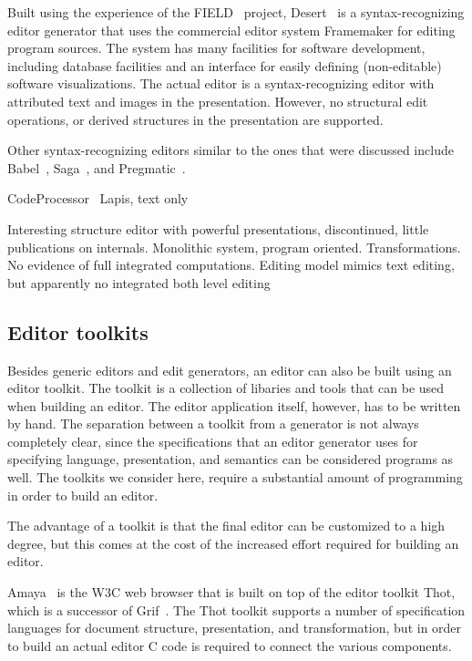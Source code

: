Built using the experience of the FIELD~\cite{reiss94field} project, Desert~\cite{reiss99desert} is a syntax-recognizing editor generator that uses the commercial editor system Framemaker for editing program sources. The system has many facilities for software development, including database facilities and an interface for easily defining (non-editable) software visualizations. The actual editor is a syntax-recognizing editor with attributed text and images in the presentation. However, no structural edit operations, or derived structures in the presentation are supported.


Other syntax-recognizing editors similar to the ones that were discussed include  Babel~\cite{horton81babel}, Saga~\cite{campbell84saga}, and Pregmatic~\cite{brand92pregmatic}.

\bc
CodeProcessor~\cite{codeprocessor}
Lapis, text only

Interesting structure editor with powerful presentations, discontinued, little publications on
internals. Monolithic system, program oriented. Transformations. No evidence of full 
integrated computations. Editing model mimics text editing, but apparently no integrated
both level editing
\ec


%																
\subsection {Editor toolkits}

Besides generic editors and edit generators, an editor can also be built using an editor toolkit. The toolkit is a collection of libaries and tools that can be used when building an editor. The editor application itself, however, has to be written by hand. The separation between a toolkit from a generator is not always completely clear, since the specifications that an editor generator uses for specifying language, presentation, and semantics can be considered programs as well. The toolkits we consider here, require a substantial amount of programming in order to build an editor.

The advantage of a toolkit is that the final editor can be customized to a high degree, but this comes at the cost of the increased effort required for building an editor. 


Amaya~\cite{amaya04} is the W3C web browser that is built on top of the editor toolkit Thot\cite{quint97thot}, which is a successor of Grif~\cite{quint86grif}. The Thot toolkit supports a number of specification languages for document structure, presentation, and transformation, but in order to build an actual editor C code is required to connect the various components.


